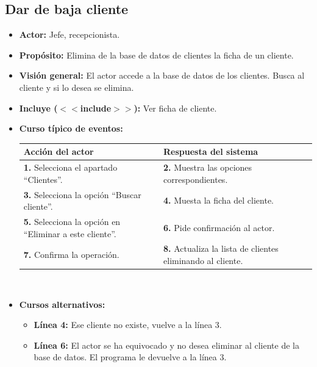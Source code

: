 \documentclass[spanish,a4paper,11pt, twoside]{report}	%
\begin{document}
	\subsection{Dar de baja cliente} 
			\begin{itemize}
			\item \textbf{Actor:} Jefe, recepcionista.
			\item \textbf{Propósito:} Elimina de la base de datos de clientes la ficha de un cliente.
			\item \textbf{Visión general:} El actor accede a la base de datos de los
				clientes.  Busca al cliente y si lo desea se elimina.
  			\item \textbf{Incluye ($<<$include$>>$):} Ver ficha de cliente.
			\item \textbf{Curso típico de eventos:} 	\\
				\begin{tabular}{|p{6cm}||p{6cm}|}
					\hline
					\textbf{Acción del actor} & \textbf{Respuesta del sistema} \\ \hline \hline
					\textbf{1.} Selecciona el apartado ``Clientes''. & 
					\textbf{2.} Muestra las opciones correspondientes. \\ \hline
					\textbf{3.} Selecciona la opción ``Buscar cliente''.	& 
					\textbf{4.} Muesta la ficha del cliente. \\ \hline
					\textbf{5.} Selecciona la opción en ``Eliminar a este cliente''. & 
					\textbf{6.} Pide confirmación al actor.\\ \hline
					\textbf{7.} Confirma la operación. & 
					\textbf{8.} Actualiza la lista de clientes eliminando al cliente. \\ \hline
				\end{tabular}
			\\
			\item \textbf{Cursos alternativos:} 
			\begin{itemize}
				\item  \textbf{Línea 4:} Ese cliente no existe, vuelve a la línea 3.
				\item  \textbf{Línea 6:} El actor se ha equivocado y no desea eliminar al cliente de la base de datos. 
					El programa le devuelve a la línea 3.
			\end {itemize}
		\end{itemize}

\end{document}
